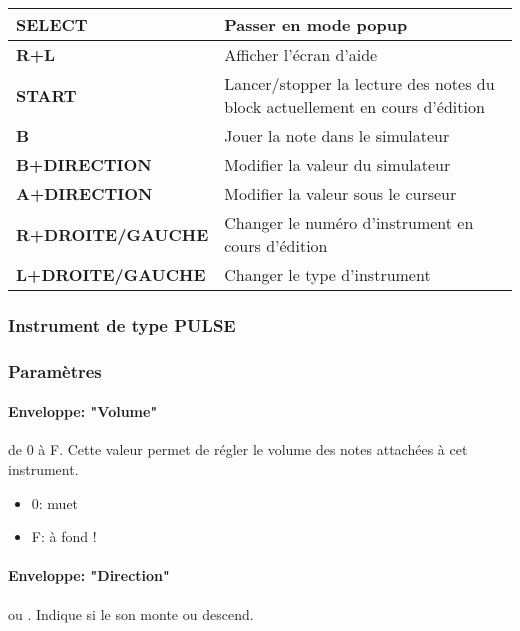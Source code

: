 \tablelasttail{\hline}
\begin{supertabular}{|l|p{11cm}|}
\hline
    {\bf SELECT} & Passer en mode popup \\
    \hline
    {\bf R+L} & Afficher l'écran d'aide \\
    \hline
    {\bf START} & Lancer/stopper la lecture des notes du block actuellement en cours d'édition \\
    \hline
    {\bf B} & Jouer la note dans le simulateur \\
    \hline
    {\bf B+DIRECTION} & Modifier la valeur du simulateur \\
    \hline
    {\bf A+DIRECTION} & Modifier la valeur sous le curseur \\
    \hline
    {\bf R+DROITE/GAUCHE} & Changer le numéro d'instrument en cours d'édition \\
    \hline
    {\bf L+DROITE/GAUCHE} & Changer le type d'instrument \\
\hline
\end{supertabular}

\subsubsection{Instrument de type PULSE}


\subsubsection{Paramètres}

\paragraph{Enveloppe: "Volume"} de 0 à F.
Cette valeur permet de régler le volume des notes attachées à cet instrument.
\medskip

\begin{itemize}
    \item{0: muet}
    \item{F: à fond !}
\end{itemize}

\paragraph{Enveloppe: "Direction"}  ou .
Indique si le son monte ou descend.

